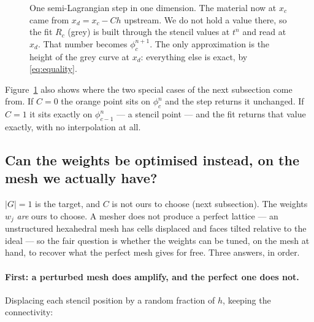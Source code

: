\documentclass[11pt,a4paper]{article}
\begin{document}
\begin{figure}[h]
\caption{One semi-Lagrangian step in one dimension. The material now at $x_c$ came from
$x_d = x_c - C h$ upstream. We do not hold a value there, so the fit $R_c$ (grey) is built
through the stencil values at $t^n$ and read at $x_d$. That number becomes $\phi^{n+1}_c$. The
only approximation is the height of the grey curve at $x_d$: everything else is exact, by
\eqref{eq:equality}.}
\label{fig:1dstep}
\end{figure}

Figure~\ref{fig:1dstep} also shows where the two special cases of the next subsection come
from. If $C = 0$ the orange point sits on $\phi^n_c$ and the step returns it unchanged. If
$C = 1$ it sits exactly on $\phi^n_{c-1}$ --- a stencil point --- and the fit returns that
value exactly, with no interpolation at all.

\subsection{Can the weights be optimised instead, on the mesh we actually have?}
\label{sec:optweights}

\(|G| = 1\) is the target, and \(C\) is not ours to choose (next subsection). The weights
\(w_j\) \emph{are} ours to choose. A mesher does not produce a perfect lattice --- an
unstructured hexahedral mesh has cells displaced and faces tilted relative to the ideal --- so
the fair question is whether the weights can be tuned, on the mesh at hand, to recover what the
perfect mesh gives for free. Three answers, in order.

\paragraph{First: a perturbed mesh does amplify, and the perfect one does not.}
Displacing each stencil position by a random fraction of \(h\), keeping the connectivity:
\end{document}
